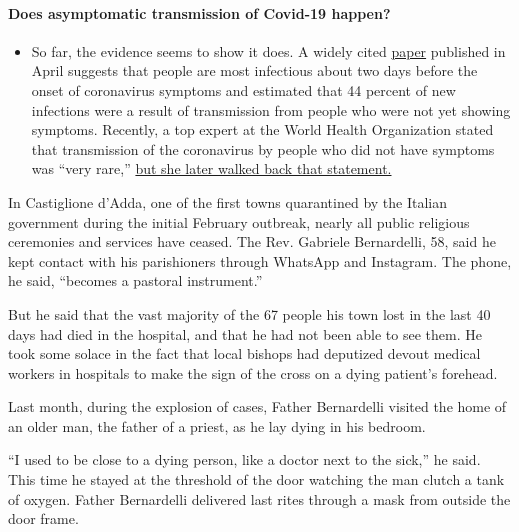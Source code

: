 \begin{itemize}
{  \paragraph{Does asymptomatic transmission of Covid-19
  happen?}\label{does-asymptomatic-transmission-of-covid-19-happen}}

  \begin{itemize}
  \tightlist
  \item
    So far, the evidence seems to show it does. A widely cited
    \href{https://www.nature.com/articles/s41591-020-0869-5}{paper}
    published in April suggests that people are most infectious about
    two days before the onset of coronavirus symptoms and estimated that
    44 percent of new infections were a result of transmission from
    people who were not yet showing symptoms. Recently, a top expert at
    the World Health Organization stated that transmission of the
    coronavirus by people who did not have symptoms was ``very rare,''
    \href{https://www.nytimes3xbfgragh.onion/2020/06/09/world/coronavirus-updates.html?action=click\&pgtype=Article\&state=default\&region=MAIN_CONTENT_3\&context=storylines_faq\#link-1f302e21}{but
    she later walked back that statement.}
  \end{itemize}
\end{itemize}

In Castiglione d'Adda, one of the first towns quarantined by the Italian
government during the initial February outbreak, nearly all public
religious ceremonies and services have ceased. The Rev. Gabriele
Bernardelli, 58, said he kept contact with his parishioners through
WhatsApp and Instagram. The phone, he said, ``becomes a pastoral
instrument.''

But he said that the vast majority of the 67 people his town lost in the
last 40 days had died in the hospital, and that he had not been able to
see them. He took some solace in the fact that local bishops had
deputized devout medical workers in hospitals to make the sign of the
cross on a dying patient's forehead.

Last month, during the explosion of cases, Father Bernardelli visited
the home of an older man, the father of a priest, as he lay dying in his
bedroom.

``I used to be close to a dying person, like a doctor next to the
sick,'' he said. This time he stayed at the threshold of the door
watching the man clutch a tank of oxygen. Father Bernardelli delivered
last rites through a mask from outside the door frame.

